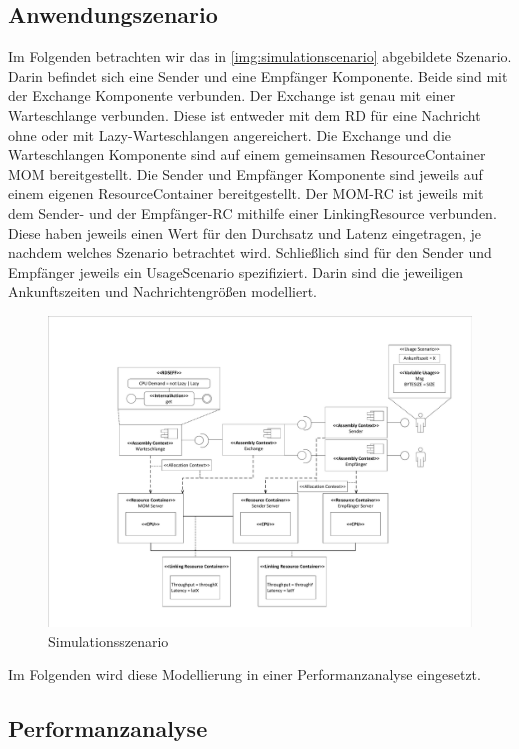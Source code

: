 \subsection{Anwendungszenario}
Im Folgenden betrachten wir das in \autoref{img:simulationscenario} abgebildete Szenario. Darin befindet sich eine Sender und eine Empfänger Komponente. Beide sind mit der Exchange Komponente verbunden. Der Exchange ist genau mit einer Warteschlange verbunden. Diese ist entweder mit dem RD für eine Nachricht ohne oder mit Lazy-Warteschlangen angereichert. Die Exchange und die Warteschlangen Komponente sind auf einem gemeinsamen ResourceContainer MOM bereitgestellt. Die Sender und Empfänger Komponente sind jeweils auf einem eigenen ResourceContainer bereitgestellt. Der MOM-RC ist jeweils mit dem Sender- und der Empfänger-RC mithilfe einer LinkingResource verbunden. Diese haben jeweils einen Wert für den Durchsatz und Latenz eingetragen, je nachdem welches Szenario betrachtet wird. Schließlich sind für den Sender und Empfänger jeweils ein UsageScenario spezifiziert. Darin sind die jeweiligen Ankunftszeiten und Nachrichtengrößen modelliert.
\begin{figure}
\center
  \includegraphics[width=1\textwidth]{images/modelSimulationResults/simulationScenario.pdf}
  \caption{Simulationsszenario }
  \label{img:simulationscenario}
\end{figure}
Im Folgenden wird diese Modellierung in einer Performanzanalyse eingesetzt.


\subsection{Performanzanalyse}

